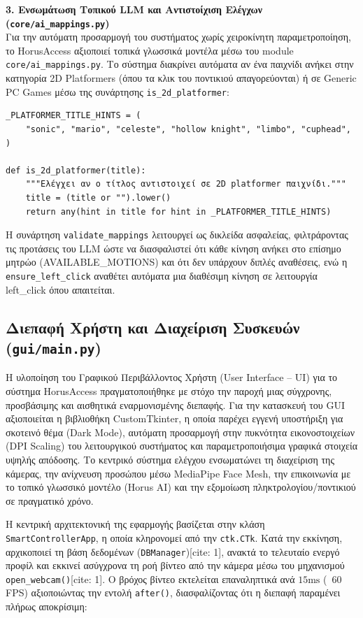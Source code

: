\documentclass[twoside, a4paper, 11pt]{article}
\newcommand{\textlatin}[1]{\textenglish{#1}}
\begin{document}
\textbf{3. Ενσωμάτωση Τοπικού LLM και Αντιστοίχιση Ελέγχων (\texttt{core/ai\_mappings.py})}\\
Για την αυτόματη προσαρμογή του συστήματος χωρίς χειροκίνητη παραμετροποίηση, το \textlatin{HorusAccess} αξιοποιεί τοπικά γλωσσικά μοντέλα μέσω του module \texttt{core/ai\_mappings.py}. Το σύστημα διακρίνει αυτόματα αν ένα παιχνίδι ανήκει στην κατηγορία \textlatin{2D Platformers} (όπου τα κλικ του ποντικιού απαγορεύονται) ή σε \textlatin{Generic PC Games} μέσω της συνάρτησης \texttt{is\_2d\_platformer}:

\begin{verbatim}
_PLATFORMER_TITLE_HINTS = (
    "sonic", "mario", "celeste", "hollow knight", "limbo", "cuphead",
)

def is_2d_platformer(title):
    """Ελέγχει αν ο τίτλος αντιστοιχεί σε 2D platformer παιχνίδι."""
    title = (title or "").lower()
    return any(hint in title for hint in _PLATFORMER_TITLE_HINTS)
\end{verbatim}

Η συνάρτηση \texttt{validate\_mappings} λειτουργεί ως δικλείδα ασφαλείας, φιλτράροντας τις προτάσεις του \textlatin{LLM} ώστε να διασφαλιστεί ότι κάθε κίνηση ανήκει στο επίσημο μητρώο (\textlatin{AVAILABLE\_MOTIONS}) και ότι δεν υπάρχουν διπλές αναθέσεις, ενώ η \texttt{ensure\_left\_click} αναθέτει αυτόματα μια διαθέσιμη κίνηση σε λειτουργία \textlatin{left\_click} όπου απαιτείται.
\subsection{Διεπαφή Χρήστη και Διαχείριση Συσκευών (\texttt{gui/main.py})}

Η υλοποίηση του Γραφικού Περιβάλλοντος Χρήστη (\textlatin{User Interface -- UI}) για το σύστημα \textlatin{HorusAccess} πραγματοποιήθηκε με στόχο την παροχή μιας σύγχρονης, προσβάσιμης και αισθητικά εναρμονισμένης διεπαφής. Για την κατασκευή του \textlatin{GUI} αξιοποιείται η βιβλιοθήκη \textlatin{CustomTkinter}, η οποία παρέχει εγγενή υποστήριξη για σκοτεινό θέμα (\textlatin{Dark Mode}), αυτόματη προσαρμογή στην πυκνότητα εικονοστοιχείων (\textlatin{DPI Scaling}) του λειτουργικού συστήματος και παραμετροποιήσιμα γραφικά στοιχεία υψηλής απόδοσης. Το κεντρικό σύστημα ελέγχου ενσωματώνει τη διαχείριση της κάμερας, την ανίχνευση προσώπου μέσω \textlatin{MediaPipe Face Mesh}, την επικοινωνία με το τοπικό γλωσσικό μοντέλο (\textlatin{Horus AI}) και την εξομοίωση πληκτρολογίου/ποντικιού σε πραγματικό χρόνο.

Η κεντρική αρχιτεκτονική της εφαρμογής βασίζεται στην κλάση \texttt{SmartControllerApp}, η οποία κληρονομεί από την \texttt{ctk.CTk}. Κατά την εκκίνηση, αρχικοποιεί τη βάση δεδομένων (\texttt{DBManager})[cite: 1], ανακτά το τελευταίο ενεργό προφίλ και εκκινεί ασύγχρονα τη ροή βίντεο από την κάμερα μέσω του μηχανισμού \texttt{open\_webcam()}[cite: 1]. Ο βρόχος βίντεο εκτελείται επαναληπτικά ανά $15\text{ms}$ (~60 FPS) αξιοποιώντας την εντολή \texttt{after()}, διασφαλίζοντας ότι η διεπαφή παραμένει πλήρως αποκρίσιμη:
\end{document}
